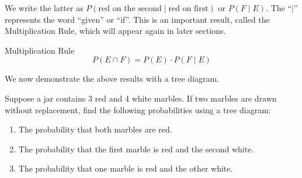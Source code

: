 We write the latter as \( P(\text{red on the second} \mid \text{red on first}) \) or \( P(F \mid E) \). The ``$|$'' represents the word ``given'' or ``if''. This is an important result, called the Multiplication Rule, which will appear again in later sections.

\begin{summarybox}{Multiplication Rule}
    \[ P(E \cap F) = P(E) \cdot P(F \mid E) \]
\end{summarybox}


We now demonstrate the above results with a tree diagram.

\begin{example}
    Suppose a jar contains 3 red and 4 white marbles. If two marbles are drawn without replacement, find the following probabilities using a tree diagram:
    \begin{enumerate}
        \item The probability that both marbles are red.
        \item The probability that the first marble is red and the second white.
        \item The probability that one marble is red and the other white.
    \end{enumerate}
\end{example}

